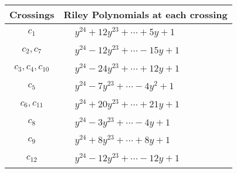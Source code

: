 \documentclass[1p]{elsarticle_modified}
\theoremstyle{definition}
\begin{document}
\begin{tabular}{m{50pt}|m{274pt}}
Crossings & \hspace{64pt}Riley Polynomials at each crossing \\
\hline $$\begin{aligned}c_{1}\end{aligned}$$&$\begin{aligned}
&y^{24}+12 y^{23}+\cdots+5 y+1
\end{aligned}$\\
\hline $$\begin{aligned}c_{2},c_{7}\end{aligned}$$&$\begin{aligned}
&y^{24}-12 y^{23}+\cdots-15 y+1
\end{aligned}$\\
\hline $$\begin{aligned}c_{3},c_{4},c_{10}\end{aligned}$$&$\begin{aligned}
&y^{24}-24 y^{23}+\cdots+12 y+1
\end{aligned}$\\
\hline $$\begin{aligned}c_{5}\end{aligned}$$&$\begin{aligned}
&y^{24}-7 y^{23}+\cdots-4 y^2+1
\end{aligned}$\\
\hline $$\begin{aligned}c_{6},c_{11}\end{aligned}$$&$\begin{aligned}
&y^{24}+20 y^{23}+\cdots+21 y+1
\end{aligned}$\\
\hline $$\begin{aligned}c_{8}\end{aligned}$$&$\begin{aligned}
&y^{24}-3 y^{23}+\cdots-4 y+1
\end{aligned}$\\
\hline $$\begin{aligned}c_{9}\end{aligned}$$&$\begin{aligned}
&y^{24}+8 y^{23}+\cdots+8 y+1
\end{aligned}$\\
\hline $$\begin{aligned}c_{12}\end{aligned}$$&$\begin{aligned}
&y^{24}-12 y^{23}+\cdots-12 y+1
\end{aligned}$\\
\hline
\end{tabular}\\~\\
\end{document}
